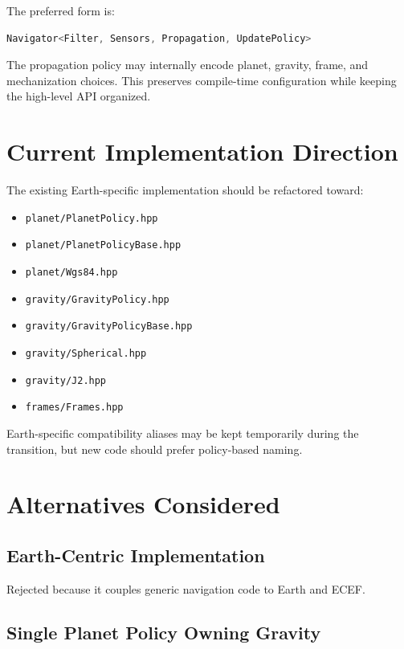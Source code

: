 \documentclass[11pt]{article}
\begin{document}
The preferred form is:

\begin{lstlisting}[language=C++]
Navigator<Filter, Sensors, Propagation, UpdatePolicy>
\end{lstlisting}

The propagation policy may internally encode planet, gravity, frame, and
mechanization choices. This preserves compile-time configuration while keeping
the high-level API organized.

\section{Current Implementation Direction}

The existing Earth-specific implementation should be refactored toward:

\begin{itemize}
    \item \texttt{planet/PlanetPolicy.hpp}
    \item \texttt{planet/PlanetPolicyBase.hpp}
    \item \texttt{planet/Wgs84.hpp}
    \item \texttt{gravity/GravityPolicy.hpp}
    \item \texttt{gravity/GravityPolicyBase.hpp}
    \item \texttt{gravity/Spherical.hpp}
    \item \texttt{gravity/J2.hpp}
    \item \texttt{frames/Frames.hpp}
\end{itemize}

Earth-specific compatibility aliases may be kept temporarily during the
transition, but new code should prefer policy-based naming.

\section{Alternatives Considered}

\subsection{Earth-Centric Implementation}

Rejected because it couples generic navigation code to Earth and ECEF.

\subsection{Single Planet Policy Owning Gravity}
\end{document}
